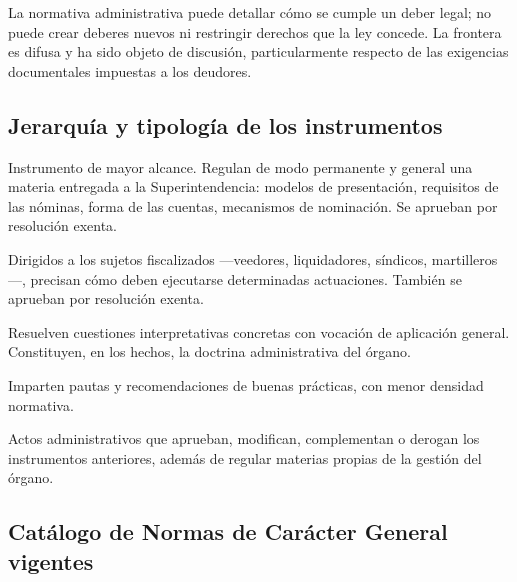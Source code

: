 \begin{alerta}
La normativa administrativa puede detallar cómo se cumple un deber legal; no puede crear
deberes nuevos ni restringir derechos que la ley concede. La frontera es difusa y ha sido
objeto de discusión, particularmente respecto de las exigencias documentales impuestas a
los deudores.
\end{alerta}

\bloqueNormativo

\subsection{Jerarquía y tipología de los instrumentos}

\begin{description}[leftmargin=0pt,style=nextline,font=\sffamily\bfseries]
  \item[Normas de Carácter General (NCG)] Instrumento de mayor alcance. Regulan de modo
  permanente y general una materia entregada a la Superintendencia: modelos de
  presentación, requisitos de las nóminas, forma de las cuentas, mecanismos de
  nominación. Se aprueban por resolución exenta.

  \item[Instructivos] Dirigidos a los sujetos fiscalizados ---veedores, liquidadores,
  síndicos, martilleros---, precisan cómo deben ejecutarse determinadas actuaciones.
  También se aprueban por resolución exenta.

  \item[Oficios de instrucción general] Resuelven cuestiones interpretativas concretas
  con vocación de aplicación general. Constituyen, en los hechos, la doctrina
  administrativa del órgano.

  \item[Oficios circulares] Imparten pautas y recomendaciones de buenas prácticas, con
  menor densidad normativa.

  \item[Resoluciones exentas] Actos administrativos que aprueban, modifican, complementan
  o derogan los instrumentos anteriores, además de regular materias propias de la gestión
  del órgano.
\end{description}

\subsection{Catálogo de Normas de Carácter General vigentes}

